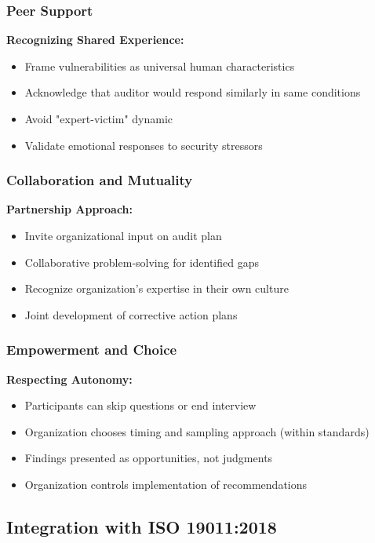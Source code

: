 \documentclass[11pt,a4paper]{article}
\begin{document}
\subsubsection{Peer Support}

\textbf{Recognizing Shared Experience:}
\begin{itemize}
\item Frame vulnerabilities as universal human characteristics
\item Acknowledge that auditor would respond similarly in same conditions
\item Avoid "expert-victim" dynamic
\item Validate emotional responses to security stressors
\end{itemize}

\subsubsection{Collaboration and Mutuality}

\textbf{Partnership Approach:}
\begin{itemize}
\item Invite organizational input on audit plan
\item Collaborative problem-solving for identified gaps
\item Recognize organization's expertise in their own culture
\item Joint development of corrective action plans
\end{itemize}

\subsubsection{Empowerment and Choice}

\textbf{Respecting Autonomy:}
\begin{itemize}
\item Participants can skip questions or end interview
\item Organization chooses timing and sampling approach (within standards)
\item Findings presented as opportunities, not judgments
\item Organization controls implementation of recommendations
\end{itemize}

\subsection{Integration with ISO 19011:2018}
\end{document}
